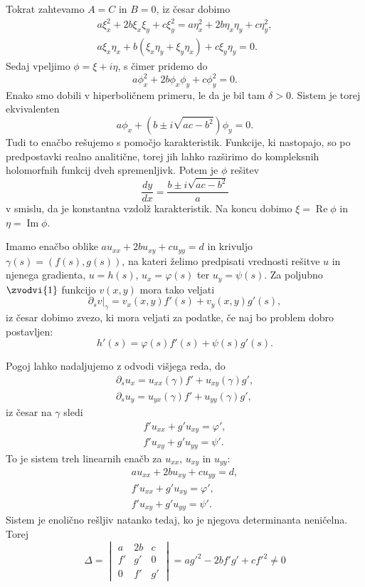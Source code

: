 Tokrat zahtevamo $A = C$ in $B=0$, iz česar dobimo
\begin{gather*}
  a \xi_x^2 + 2b \xi_x \xi_y + c \xi_y^2 = a \eta_x^2 + 2b \eta_x \eta_y + c
  \eta_y^2, \\
  a \xi_x \eta_x + b(\xi_x \eta_y + \xi_y \eta_x) + c \xi_y \eta_y = 0.
\end{gather*}
Sedaj vpeljimo $\phi = \xi + i \eta$, s čimer pridemo do
\[
  a \phi_x^2 + 2b \phi_x \phi_y + c \phi_y^2 = 0.
\]
Enako smo dobili v hiperboličnem primeru, le da je bil tam $\delta > 0$.
Sistem je torej ekvivalenten
\[
  a \phi_x + (b \pm i \sqrt{ac - b^2}) \phi_y = 0.
\]
Tudi to enačbo rešujemo s pomočjo karakteristik.
Funkcije, ki nastopajo, so po predpostavki realno analitične, torej jih lahko
razširimo do kompleksnih holomorfnih funkcij dveh spremenljivk.
Potem je $\phi$ rešitev
\[
  \frac{dy}{dx} = \frac{b \pm i \sqrt{ac -b^2}}{a}
\]
v smislu, da je konstantna vzdolž karakteristik.
Na koncu dobimo $\xi = \operatorname{Re} \phi$ in $\eta = \operatorname{Im}
\phi$.



Imamo enačbo oblike $a u_{xx} + 2b u_{xy} + c u_{yy} = d$ in krivuljo $\gamma(s)
= (f(s), g(s))$, na kateri želimo predpisati vrednosti rešitve $u$ in njenega
gradienta, $u = h(s)$, $u_x = \varphi(s)$ ter $u_y = \psi(s)$.
Za poljubno $\zvodvi{1}$ funkcijo $v(x,y)$ mora tako veljati
\[
  \left. \partial_s v \right|_\gamma = v_x(x,y) f'(s) + v_y(x,y) g'(s),
\]
iz česar dobimo zvezo, ki mora veljati za podatke, če naj bo problem dobro
postavljen:
\[
  h'(s) = \varphi(s) f'(s) + \psi(s) g'(s).
\]


Pogoj lahko nadaljujemo z odvodi višjega reda, do
\begin{gather*}
  \partial_s u_x = u_{xx}(\gamma) f' + u_{xy}(\gamma) g', \\
  \partial_s u_y = u_{yx}(\gamma) f' + u_{yy}(\gamma) g',
\end{gather*}
iz česar na $\gamma$ sledi
\begin{gather*}
  f' u_{xx} + g' u_{xy} = \varphi', \\
  f' u_{xy} + g' u_{yy} = \psi'.
\end{gather*}
To je sistem treh linearnih enačb za $u_{xx}$, $u_{xy}$ in $u_{yy}$:
\begin{gather*}
  a u_{xx} + 2b u_{xy} + c u_{yy} = d, \\
  f' u_{xx} + g' u_{xy} = \varphi', \\
  f' u_{xy} + g' u_{yy} = \psi'.
\end{gather*}
Sistem je enolično rešljiv natanko tedaj, ko je njegova determinanta neničelna.
Torej
\[
  \Delta =
  \begin{vmatrix}
	a & 2b & c \\
	f' & g' & 0 \\
	0 & f' & g'
  \end{vmatrix}
  = a g'^2 - 2b f' g' + c f'^2 \ne 0
\]

